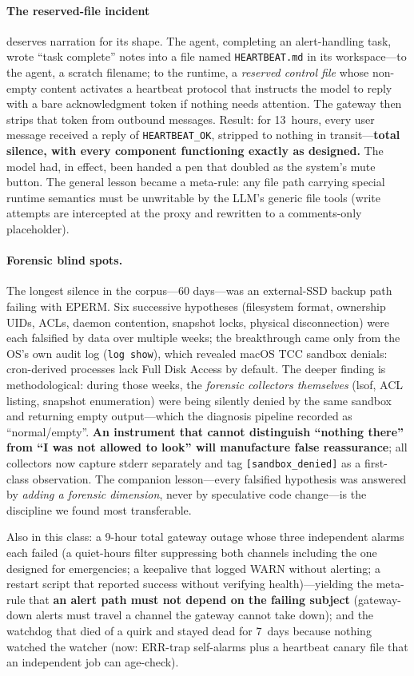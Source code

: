 \paragraph{The reserved-file incident} deserves narration for its shape.
The agent, completing an alert-handling task, wrote ``task complete''
notes into a file named \texttt{HEARTBEAT.md} in its workspace---to the
agent, a scratch filename; to the runtime, a \emph{reserved control file}
whose non-empty content activates a heartbeat protocol that instructs the
model to reply with a bare acknowledgment token if nothing needs
attention. The gateway then strips that token from outbound messages.
Result: for 13~hours, every user message received a reply of
\texttt{HEARTBEAT\_OK}, stripped to nothing in transit---\textbf{total
silence, with every component functioning exactly as designed.} The model
had, in effect, been handed a pen that doubled as the system's mute
button. The general lesson became a meta-rule: any file path carrying
special runtime semantics must be unwritable by the LLM's generic file
tools (write attempts are intercepted at the proxy and rewritten to a
comments-only placeholder).

\paragraph{Forensic blind spots.} The longest silence in the corpus---60
days---was an external-SSD backup path failing with EPERM. Six successive
hypotheses (filesystem format, ownership UIDs, ACLs, daemon contention,
snapshot locks, physical disconnection) were each falsified by data over
multiple weeks; the breakthrough came only from the OS's own audit log
(\texttt{log show}), which revealed macOS TCC sandbox denials:
cron-derived processes lack Full Disk Access by default. The deeper
finding is methodological: during those weeks, the \emph{forensic
collectors themselves} (lsof, ACL listing, snapshot enumeration) were
being silently denied by the same sandbox and returning empty
output---which the diagnosis pipeline recorded as ``normal/empty''.
\textbf{An instrument that cannot distinguish ``nothing there'' from ``I
was not allowed to look'' will manufacture false reassurance}; all
collectors now capture stderr separately and tag
\texttt{[sandbox\_denied]} as a first-class observation. The companion
lesson---every falsified hypothesis was answered by \emph{adding a
forensic dimension}, never by speculative code change---is the discipline
we found most transferable.

Also in this class: a 9-hour total gateway outage whose three independent
alarms each failed (a quiet-hours filter suppressing both channels
including the one designed for emergencies; a keepalive that logged WARN
without alerting; a restart script that reported success without
verifying health)---yielding the meta-rule that \textbf{an alert path
must not depend on the failing subject} (gateway-down alerts must travel
a channel the gateway cannot take down); and the watchdog that died of a
 quirk and stayed dead for 7~days because nothing watched the
watcher (now: ERR-trap self-alarms plus a heartbeat canary file that an
independent job can age-check).
